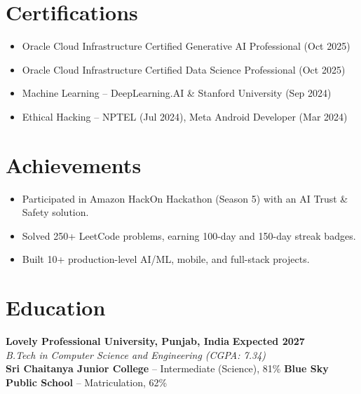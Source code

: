\documentclass[10pt,a4paper]{article}
\newcommand{\resumeSubheading}[4]{
  \textbf{#1} \hfill \textbf{#2}\\
  \textit{#3} \hfill \textit{#4}\\
}
\begin{document}
\section*{Certifications}
\begin{itemize}
  \item Oracle Cloud Infrastructure Certified Generative AI Professional (Oct 2025)
  \item Oracle Cloud Infrastructure Certified Data Science Professional (Oct 2025)
  \item Machine Learning -- DeepLearning.AI \& Stanford University (Sep 2024)
  \item Ethical Hacking -- NPTEL (Jul 2024), Meta Android Developer (Mar 2024)
\end{itemize}

\section*{Achievements}
\begin{itemize}
  \item Participated in Amazon HackOn Hackathon (Season 5) with an AI Trust \& Safety solution.
  \item Solved 250+ LeetCode problems, earning 100-day and 150-day streak badges.
  \item Built 10+ production-level AI/ML, mobile, and full-stack projects.
\end{itemize}

\section*{Education}
\resumeSubheading
  {Lovely Professional University, Punjab, India}{Expected 2027}
  {B.Tech in Computer Science and Engineering (CGPA: 7.34)}{}
\textbf{Sri Chaitanya Junior College} -- Intermediate (Science), 81\% \hfill
\textbf{Blue Sky Public School} -- Matriculation, 62\%
\end{document}

